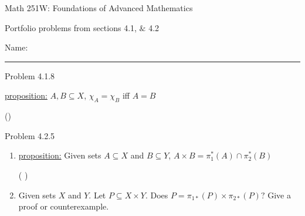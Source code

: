 \documentclass{article}
\theoremstyle{definition}
\begin{document}
	\begin{center}
		\Large{Math 251W: Foundations of Advanced Mathematics}

		\normalsize  Portfolio problems from sections 4.1, $\&$
		4.2

		\hfill Name:

		\hrule \vspace{0.4cm}


		\vspace{0.75cm}
	\end{center}




	\vspace{1cm}

	\noindent Problem 4.1.8  \vspace{0.3cm}


	\underline{proposition:} $A,B\subseteq X$, $\chi_A=\chi_B$ iff
	$A=B$

	\vspace{.2cm}

	 () \vspace{.15cm}



	\vspace{1cm}



	\noindent Problem 4.2.5  \vspace{0.3cm}

	\begin{enumerate}
		\item[2]
		\underline{proposition:} Given sets $A\subseteq X$ and $B\subseteq
		Y$, $A\times B=\pi_1^*(A)\cap \pi_2^*(B)$

		\vspace{.2cm}

		 ( ) \vspace{.15cm}




		\item[3]
		Given sets $X$ and $Y$. Let $P\subseteq X\times Y$. Does $P=\pi_{1*}(P)\times\pi_{2*}(P)?$  Give a proof or counterexample.

		\vspace{.2cm}
		\vspace{.15cm}


	\end{enumerate}
	\vspace{1cm}
\end{document}
